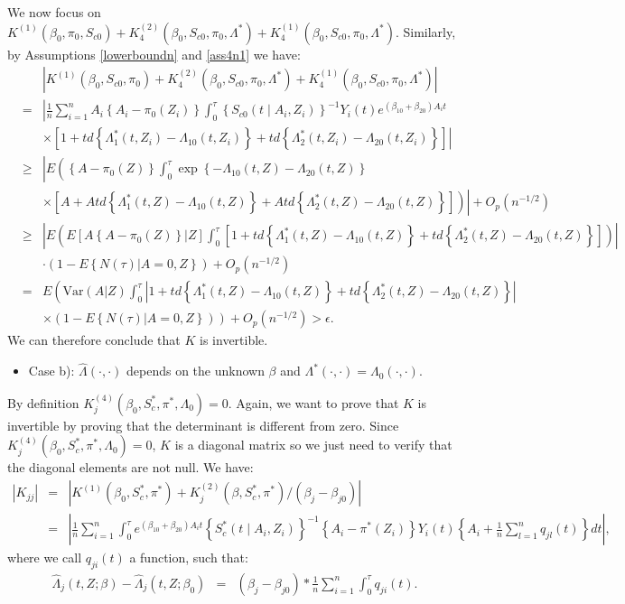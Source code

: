 \documentclass[11pt]{article}
\newcommand{\eqnn}{\begin{eqnarray*}}
\newcommand{\een}{\end{eqnarray*}}
\begin{document}
We now focus on $K^{(1)}(\beta_0,\pi_{0},S_{c0})+K^{(2)}_{4}(\beta_0,S_{c0},\pi_{0},\Lambda^{*})+K^{(1)}_{4}(\beta_0,S_{c0},\pi_{0},\Lambda^{*})$.
Similarly, by Assumptions \ref{lowerboundn} and \ref{ass4n1} we have:
\eqnn
&&\left|K^{(1)}(\beta_0,S_{c0},\pi_{0})+K^{(2)}_{4}(\beta_0,S_{c0},\pi_{0},\Lambda^{*})+K^{(1)}_{4}(\beta_0,S_{c0},\pi_{0},\Lambda^{*})\right|\\
&=&\left|\frac{1}{n}\sum_{i=1}^n A_i\left\{A_i-\pi_0(Z_i)\right\}\int_0^\tau\left\{S_{c0}(t \mid A_i,Z_i)\right\}^{-1}Y_i(t)e^{(\beta_{10}+\beta_{20})A_i t}\right.\\&&\left.\times \left[1 +td\left\{\Lambda_1^{*}(t,Z_i)-\Lambda_{10}(t,Z_i)\right\}+t d\left\{\Lambda_2^{*}(t,Z_i)-\Lambda_{20}(t,Z_i)\right\}\right]\right|\\
&\geq&\left|E\left(\left\{A-\pi_0(Z)\right\}\int_0^\tau\exp\left\{-\Lambda_{10}(t,Z)-\Lambda_{20}(t,Z)\right\}\right.\right.\\&&\left.\left.\times\left[A +Atd\left\{\Lambda_1^{*}(t,Z)-\Lambda_{10}(t,Z)\right\}+A t d\left\{\Lambda_2^{*}(t,Z)-\Lambda_{20}(t,Z)\right\}\right]\right)\right|+O_p(n^{-1/2})\\
&\geq& \left|E\left(E\left[A\left\{A-\pi_0(Z)\right\} | Z\right]\int_0^\tau\left[1 +td\left\{\Lambda_1^{*}(t,Z)-\Lambda_{10}(t,Z)\right\}+t d\left\{\Lambda_2^{*}(t,Z)-\Lambda_{20}(t,Z)\right\}\right]\right)\right|\nonumber\\&&\cdot(1-E\left\{N(\tau) | A=0,Z\right\})+O_p(n^{-1/2})\\
&=&E\left(\mbox{Var}\left(A | Z\right) \int_0^{\tau}\left|1+td\left\{\Lambda_1^{*}(t,Z)-\Lambda_{10}(t,Z)\right\}+t d\left\{\Lambda_2^{*}(t,Z)-\Lambda_{20}(t,Z)\right\}\right|\right.\\&&\left.  \times(1-E\left\{\left.N(\tau) \right| A=0,Z\right\})\right)+O_p(n^{-1/2})>\epsilon.
\een
We can therefore conclude that ${K}$ is invertible.

\begin{itemize}
\item{Case b)}: $\hat \Lambda(\cdot,\cdot)$ depends on the unknown $\beta$ and $\Lambda^{*}(\cdot,\cdot)=\Lambda_0(\cdot,\cdot)$.
\end{itemize}

By definition $K^{(4)}_j(\beta_0, S^{*}_c, \pi^{*}, \Lambda_0)=0$.
Again, we want to prove that ${K}$ is invertible by proving that the determinant is different from zero.
Since $K^{(4)}_j(\beta_0, S^{*}_c, \pi^{*}, \Lambda_0)=0$, ${K}$ is a diagonal matrix so we just need to verify that the diagonal elements are not null.
We have:
\eqnn
\left|{K}_{jj}\right|&=&\left|K^{(1)}(\beta_0,S^{*}_c, \pi^{*})+K^{(2)}_j(\beta,S^{*}_c, \pi^{*})/(\beta_j-\beta_{j0})\right|\\
&=&\left|\frac{1}{n}\sum_{i=1}^n\int_0^\tau e^{ (\beta_{10}  + \beta_{20}) A_i t}\left\{S^{*}_c(t \mid A_i,Z_i)\right\}^{-1}\left\{A_i -\pi^{*}( Z_i)\right\}Y_i(t)\left\{A_i+\frac{1}{n}\sum_{l=1}^nq_{jl}(t)\right\}dt\right|,\nonumber\een
where we call $q_{ji}(t)$ a function, such that:
\eqnn
\hat \Lambda_{j}(t, Z ; \beta)-\hat \Lambda_{j}(t, Z ; \beta_0)&=&(\beta_j-\beta_{j0})*\frac{1}{n}\sum_{i=1}^n\int_0^\tau q_{ji}(t).
\een
\end{document}
